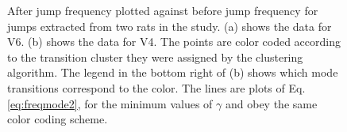 \documentclass[twocolumn, prl]{revtex4}
\begin{document}
\begin{figure}
\begin{center}
\caption{\label{fig:jumps}After jump frequency plotted against before jump frequency for jumps extracted from two rats in the study. (a) shows the data for V6. (b) shows the data for V4. The points are color coded according to the transition cluster they were assigned by the clustering algorithm. The legend in the bottom right of (b) shows which mode transitions correspond to the color.  The lines are plots of Eq. \ref{eq:freqmode2}, for the minimum values of $\gamma$ and obey the same color coding scheme.} 
\end{center}
\end{figure}
\end{document}
